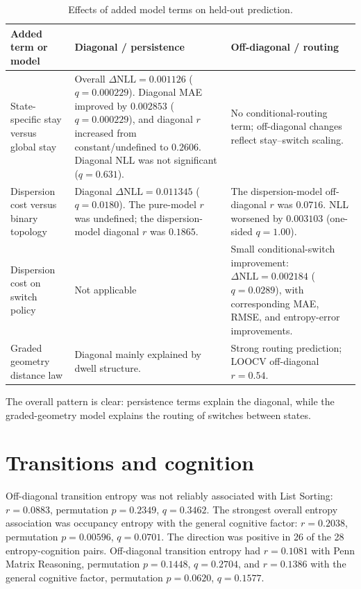 \documentclass[12pt,a4paper]{report}
\newcommand{\compacttablestyle}{%
  \captionsetup{font=footnotesize,skip=2pt}%
  \small
  \setlength{\tabcolsep}{3pt}%
  \renewcommand{\arraystretch}{0.85}%
}
\begin{document}
\begin{table}[H]
\centering
\compacttablestyle
\caption{Effects of added model terms on held-out prediction.}
\label{tab:added_model_terms}
\footnotesize
{}
\renewcommand{\arraystretch}{1.15}
\begin{tabularx}{\textwidth}{@{}
>{\raggedright\arraybackslash}p{}
>{\raggedright\arraybackslash}p{}
>{\raggedright\arraybackslash}X
@{}}
\toprule
\textbf{Added term or model} & \textbf{Diagonal / persistence} & \textbf{Off-diagonal / routing} \\
\midrule
State-specific stay versus global stay
& Overall $\Delta\mathrm{NLL}=0.001126$ ($q=0.000229$). Diagonal MAE improved by $0.002853$ ($q=0.000229$), and diagonal $r$ increased from constant/undefined to $0.2606$. Diagonal NLL was not significant ($q=0.631$).
& No conditional-routing term; off-diagonal changes reflect stay--switch scaling. \\
\addlinespace[5pt]

Dispersion cost versus binary topology
& Diagonal $\Delta\mathrm{NLL}=0.011345$ ($q=0.0180$). The pure-model $r$ was undefined; the dispersion-model diagonal $r$ was $0.1865$.
& The dispersion-model off-diagonal $r$ was $0.0716$. NLL worsened by $0.003103$ (one-sided $q=1.00$). \\
\addlinespace[5pt]

Dispersion cost on switch policy
& Not applicable
& Small conditional-switch improvement: $\Delta\mathrm{NLL}=0.002184$ ($q=0.0289$), with corresponding MAE, RMSE, and entropy-error improvements. \\
\addlinespace[5pt]

Graded geometry distance law
& Diagonal mainly explained by dwell structure.
& Strong routing prediction; LOOCV off-diagonal $r=0.54$. \\
\bottomrule
\end{tabularx}
\end{table}

The overall pattern is clear: persistence terms explain the diagonal, while the graded-geometry model explains the routing of switches between states.

\section{Transitions and cognition}

Off-diagonal transition entropy was not reliably associated with List Sorting: $r=0.0883$, permutation $p=0.2349$, $q=0.3462$. The strongest overall entropy association was occupancy entropy with the general cognitive factor: $r=0.2038$, permutation $p=0.00596$, $q=0.0701$. The direction was positive in 26 of the 28 entropy-cognition pairs. Off-diagonal transition entropy had $r=0.1081$ with Penn Matrix Reasoning, permutation $p=0.1448$, $q=0.2704$, and $r=0.1386$ with the general cognitive factor, permutation $p=0.0620$, $q=0.1577$.
\end{document}
